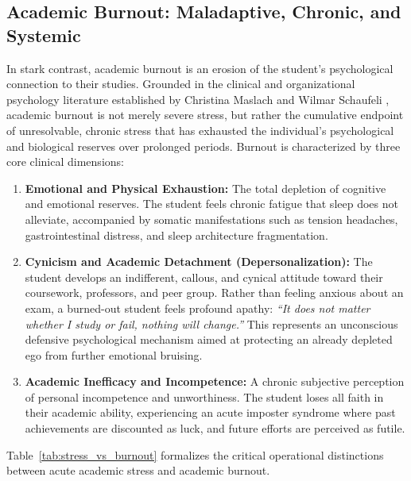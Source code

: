 \documentclass[12pt,a4paper,oneside]{report}
\begin{document}
\subsection{Academic Burnout: Maladaptive, Chronic, and Systemic}
In stark contrast, academic burnout is an erosion of the student's psychological connection to their studies. Grounded in the clinical and organizational psychology literature established by Christina Maslach and Wilmar Schaufeli \cite{maslach1981, schaufeli2002}, academic burnout is not merely severe stress, but rather the cumulative endpoint of unresolvable, chronic stress that has exhausted the individual's psychological and biological reserves over prolonged periods. Burnout is characterized by three core clinical dimensions:
\begin{enumerate}
    \item \textbf{Emotional and Physical Exhaustion:} The total depletion of cognitive and emotional reserves. The student feels chronic fatigue that sleep does not alleviate, accompanied by somatic manifestations such as tension headaches, gastrointestinal distress, and sleep architecture fragmentation.
    \item \textbf{Cynicism and Academic Detachment (Depersonalization):} The student develops an indifferent, callous, and cynical attitude toward their coursework, professors, and peer group. Rather than feeling anxious about an exam, a burned-out student feels profound apathy: \emph{``It does not matter whether I study or fail, nothing will change.''} This represents an unconscious defensive psychological mechanism aimed at protecting an already depleted ego from further emotional bruising.
    \item \textbf{Academic Inefficacy and Incompetence:} A chronic subjective perception of personal incompetence and unworthiness. The student loses all faith in their academic ability, experiencing an acute imposter syndrome where past achievements are discounted as luck, and future efforts are perceived as futile.
\end{enumerate}

Table~\ref{tab:stress_vs_burnout} formalizes the critical operational distinctions between acute academic stress and academic burnout.
\end{document}
